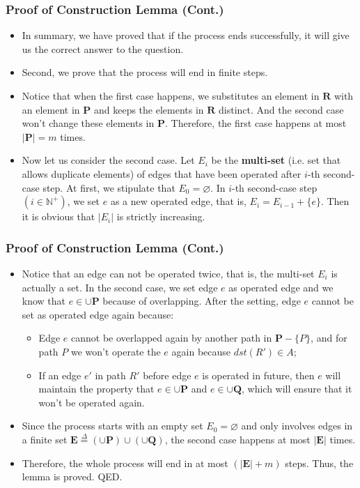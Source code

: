 \documentclass[notheorems]{beamer}
\begin{document}
\begin{frame}
\frametitle{Proof of Construction Lemma (Cont.)}
\begin{itemize}
\item In summary, we have proved that if the process ends successfully, it will give us the correct answer to the question.
\pause
\item Second, we prove that the process will end in finite steps.
\pause
\item Notice that when the first case happens, we substitutes an element in $\mathbf{R}$ with an element in $\mathbf{P}$ and keeps the elements in $\mathbf{R}$ distinct. And the second case won't change these elements in $\mathbf{P}$. Therefore, the first case happens at most $|\mathbf{P}| = m$ times.
\pause
\item Now let us consider the second case. Let $E_i$ be the \textbf{multi-set} (i.e. set that allows duplicate elements) of edges that have been operated after $i$-th second-case step. At first, we stipulate that $E_0 = \varnothing$. In $i$-th second-case step $(i\in\mathbb{N}^+)$, we set $e$ as a new operated edge, that is, $E_i = E_{i-1} + \{e\}$. Then it is obvious that $|E_i|$ is strictly increasing.
\end{itemize}
\end{frame}

\begin{frame}
\frametitle{Proof of Construction Lemma (Cont.)}
\begin{itemize}
\item Notice that an edge can not be operated twice, that is, the multi-set $E_i$ is actually a set. In the second case, we set edge $e$ as operated edge and we know that $e \in \cup{\mathbf{P}}$ because of overlapping. After the setting, edge $e$ cannot be set as operated edge again because:
    \begin{itemize}
    \item Edge $e$ cannot be overlapped again by another path in $\mathbf{P} - \{P\}$, and for path $P$ we won't operate the $e$ again because $dst(R') \in A$;
    \item If an edge $e'$ in path $R'$ before edge $e$ is operated in future, then $e$ will maintain the property that $e \in \cup\mathbf{P}$ and $e \in \cup\mathbf{Q}$, which will ensure that it won't be operated again.
    \end{itemize}
\pause
\item Since the process starts with an empty set $E_0 = \varnothing$ and only involves edges in a finite set $\mathbf{E} \stackrel{\Delta}{=} (\cup{\mathbf{P}}) \cup (\cup{\mathbf{Q}})$, the second case happens at most $|\mathbf{E}|$ times.
\item Therefore, the whole process will end in at most $(|\mathbf{E}| + m)$ steps. Thus, the lemma is proved. QED.
\end{itemize}
\end{frame}
\end{document}
